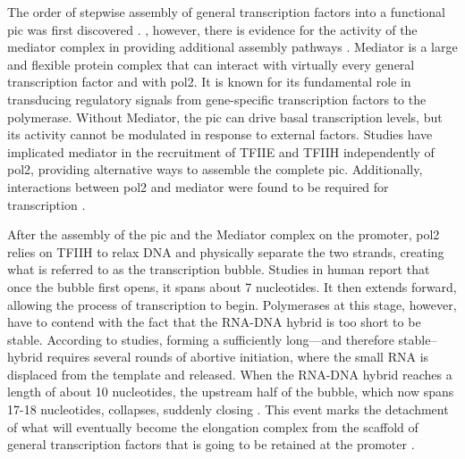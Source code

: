 The order of stepwise assembly of general transcription factors into a functional \gls{pic} was first discovered \invitro{} \cite{buratowski:1989:five}. 
\Invivo{}, however, there is evidence for the activity of the mediator complex in providing additional assembly pathways \cite{esnault:2008:mediatordependent}.
Mediator is a large and flexible protein complex that can interact with virtually every general transcription factor and with \gls{pol2}.
It is known for its fundamental role in transducing regulatory signals from gene-specific transcription factors to the polymerase.
Without Mediator, the \gls{pic} can drive basal transcription levels, but its activity cannot be modulated in response to external factors.
Studies have implicated mediator in the recruitment of TFIIE and TFIIH independently of \gls{pol2}, providing alternative ways to assemble the complete \gls{pic}.
Additionally, interactions between \gls{pol2} and mediator were found to be required for transcription \invivo{} \cite{soutourina:2011:direct}.

After the assembly of the \gls{pic} and the Mediator complex on the promoter, \gls{pol2} relies on TFIIH to relax DNA and physically separate the two strands, creating what is referred to as the transcription bubble.
Studies in human report that once the bubble first opens, it spans about 7 nucleotides.
It then extends forward, allowing the process of transcription to begin.
Polymerases at this stage, however, have to contend with the fact that the RNA-DNA hybrid is too short to be stable.
According to \invitro{} studies, forming a sufficiently long---and therefore stable--hybrid requires several rounds of abortive initiation, where the small RNA is displaced from the template and released.
When the RNA-DNA hybrid reaches a length of about 10 nucleotides, the upstream half of the bubble, which now spans 17-18 nucleotides, collapses, suddenly closing \cite{holstege:1997:three}.
This event marks the detachment of what will eventually become the elongation complex from the scaffold of general transcription factors that is going to be retained at the promoter \cite{pal:2005:role}.

\clearpage